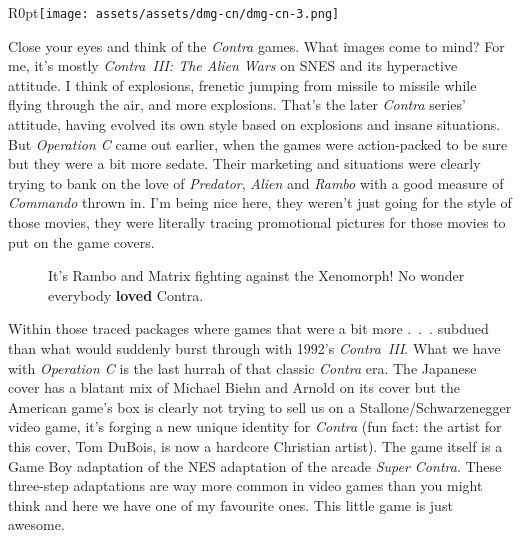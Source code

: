 \documentclass{book}
\begin{document}
\begin{wrapfigure}{R}{0pt}{\texttt{[image: assets/assets/dmg-cn/dmg-cn-3.png]}}\end{wrapfigure}
Close your eyes and think of the \emph{Contra} games. What images come to mind? For me, it’s mostly \emph{Contra~III: The Alien Wars} on SNES and its hyperactive attitude. I think of explosions, frenetic jumping from missile to missile while flying through the air, and more explosions. That’s the later \emph{Contra} series’ attitude, having evolved its own style based on explosions and insane situations. But \emph{Operation C} came out earlier, when the games were action-packed to be sure but they were a bit more sedate. Their marketing and situations were clearly trying to bank on the love of \emph{Predator}, \emph{Alien} and \emph{Rambo} with a good measure of \emph{Commando} thrown in. I’m being nice here, they weren’t just going for the style of those movies, they were literally tracing promotional pictures for those movies to put on the game covers.\par
\FloatBarrier\vspace{\baselineskip}\begin{figure}[H]\caption*{It’s Rambo and Matrix fighting against the Xenomorph! No wonder everybody \textbf{loved} Contra.}\end{figure}
Within those traced packages where games that were a bit more .~.~. subdued than what would suddenly burst through with 1992’s \emph{Contra~III}. What we have with \emph{Operation C} is the last hurrah of that classic \emph{Contra} era. The Japanese cover has a blatant mix of Michael Biehn and Arnold on its cover but the American game’s box is clearly not trying to sell us on a Stallone/Schwarzenegger video game, it’s forging a new unique identity for \emph{Contra} (fun fact: the artist for this cover, Tom DuBois, is now a hardcore Christian artist). The game itself is a Game Boy adaptation of the NES adaptation of the arcade \emph{Super Contra}. These three-step adaptations are way more common in video games than you might think and here we have one of my favourite ones. This little game is just awesome.\par
\FloatBarrier\vspace{\baselineskip}\begin{figure}[H]\end{figure}
\end{document}
